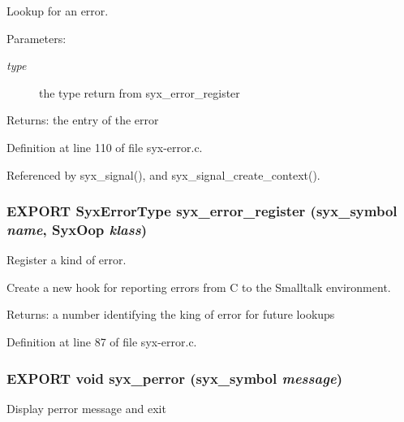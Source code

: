 Lookup for an error.

\begin{Desc}
\item[Parameters:]
\begin{description}
\item[{\em type}]the type return from syx\_\-error\_\-register \end{description}
\end{Desc}
\begin{Desc}
\item[Returns:]the entry of the error \end{Desc}


Definition at line 110 of file syx-error.c.

Referenced by syx\_\-signal(), and syx\_\-signal\_\-create\_\-context().\hypertarget{syx-error_8h_4c29dc7eb28340f780caced4fca607d3}{
\subsubsection{\setlength{\rightskip}{0pt plus 5cm}EXPORT {\bf SyxErrorType} syx\_\-error\_\-register ({\bf syx\_\-symbol} {\em name}, \/  {\bf SyxOop} {\em klass})}}
\label{syx-error_8h_4c29dc7eb28340f780caced4fca607d3}


Register a kind of error.

Create a new hook for reporting errors from C to the Smalltalk environment.

\begin{Desc}
\item[Returns:]a number identifying the king of error for future lookups \end{Desc}


Definition at line 87 of file syx-error.c.\hypertarget{syx-error_8h_5498659f88970b75f4e9391eed50d5b2}{
\subsubsection{\setlength{\rightskip}{0pt plus 5cm}EXPORT void syx\_\-perror ({\bf syx\_\-symbol} {\em message})}}
\label{syx-error_8h_5498659f88970b75f4e9391eed50d5b2}


Display perror message and exit 

